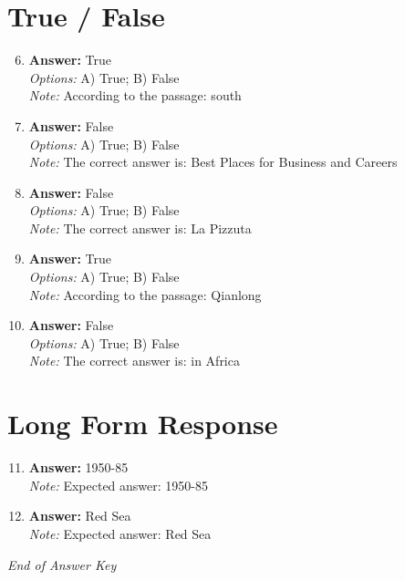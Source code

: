\documentclass[12pt]{article}
\begin{document}
\section*{True / False}
\begin{enumerate}[label=\arabic*.]
\setcounter{enumi}{5}
\item \textbf{Answer:} True
\\ \textit{Options:} A) True; B) False
\\ \textit{Note:} According to the passage: south
\item \textbf{Answer:} False
\\ \textit{Options:} A) True; B) False
\\ \textit{Note:} The correct answer is: Best Places for Business and Careers
\item \textbf{Answer:} False
\\ \textit{Options:} A) True; B) False
\\ \textit{Note:} The correct answer is: La Pizzuta
\item \textbf{Answer:} True
\\ \textit{Options:} A) True; B) False
\\ \textit{Note:} According to the passage: Qianlong
\item \textbf{Answer:} False
\\ \textit{Options:} A) True; B) False
\\ \textit{Note:} The correct answer is: in Africa
\end{enumerate}

\section*{Long Form Response}
\begin{enumerate}[label=\arabic*.]
\setcounter{enumi}{10}
\item \textbf{Answer:} 1950-85
\\ \textit{Note:} Expected answer: 1950-85
\item \textbf{Answer:} Red Sea
\\ \textit{Note:} Expected answer: Red Sea
\end{enumerate}

\vfill
\noindent\textit{End of Answer Key}
\end{document}
